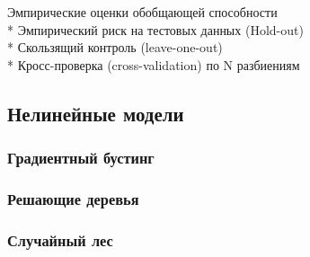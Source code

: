 Эмпирические оценки обобщающей способности\\
* Эмпирический риск на тестовых данных (Hold-out)\\
* Скользящий контроль (leave-one-out)\\
* Кросс-проверка (cross-validation) по N разбиениям\\

\subsection{Нелинейные модели}

\subsubsection{Градиентный бустинг}

\subsubsection{Решающие деревья}

\subsubsection{Случайный лес}
